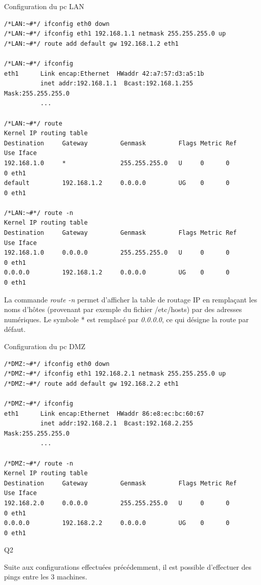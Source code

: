 \documentclass[frenchb, 11pt]{article}
\newlength{\leftbarwidth}
\newlength{\leftbarsep}
\newcommand*{\leftbarcolorcmd}{\color{leftbarcolor}} %
\renewenvironment{leftbar}{%
    \def\FrameCommand{{\leftbarcolorcmd{\vrule width \leftbarwidth\relax\hspace {\leftbarsep}}}}%
    \MakeFramed {\advance \hsize -\width \FrameRestore }%
}{%
    \endMakeFramed
}
\begin{document}
\noindent Configuration du pc LAN
\begin{lstlisting}
/*LAN:~#*/ ifconfig eth0 down
/*LAN:~#*/ ifconfig eth1 192.168.1.1 netmask 255.255.255.0 up
/*LAN:~#*/ route add default gw 192.168.1.2 eth1

/*LAN:~#*/ ifconfig
eth1      Link encap:Ethernet  HWaddr 42:a7:57:d3:a5:1b
          inet addr:192.168.1.1  Bcast:192.168.1.255  Mask:255.255.255.0
          ...

/*LAN:~#*/ route
Kernel IP routing table
Destination     Gateway         Genmask         Flags Metric Ref    Use Iface
192.168.1.0     *               255.255.255.0   U     0      0        0 eth1
default         192.168.1.2     0.0.0.0         UG    0      0        0 eth1

/*LAN:~#*/ route -n
Kernel IP routing table
Destination     Gateway         Genmask         Flags Metric Ref    Use Iface
192.168.1.0     0.0.0.0         255.255.255.0   U     0      0        0 eth1
0.0.0.0         192.168.1.2     0.0.0.0         UG    0      0        0 eth1
\end{lstlisting}

La commande \emph{route -n} permet d'afficher la table de routage IP en remplaçant les noms d'hôtes (provenant par exemple du fichier /etc/hosts) par des adresses numériques. Le symbole * est remplacé par \emph{0.0.0.0}, ce qui désigne la route par défaut.
\newpage

\noindent Configuration du pc DMZ
\begin{lstlisting}
/*DMZ:~#*/ ifconfig eth0 down
/*DMZ:~#*/ ifconfig eth1 192.168.2.1 netmask 255.255.255.0 up
/*DMZ:~#*/ route add default gw 192.168.2.2 eth1

/*DMZ:~#*/ ifconfig
eth1      Link encap:Ethernet  HWaddr 86:e8:ec:bc:60:67
          inet addr:192.168.2.1  Bcast:192.168.2.255  Mask:255.255.255.0
          ...

/*DMZ:~#*/ route -n
Kernel IP routing table
Destination     Gateway         Genmask         Flags Metric Ref    Use Iface
192.168.2.0     0.0.0.0         255.255.255.0   U     0      0        0 eth1
0.0.0.0         192.168.2.2     0.0.0.0         UG    0      0        0 eth1
\end{lstlisting}

\begin{leftbar}
\noindent Q2 %
\end{leftbar}

Suite aux configurations effectuées précédemment, il est possible d'effectuer des pings entre les 3 machines.

\newpage

\begin{thebibliography}{5}
\end{thebibliography}
\end{document}
